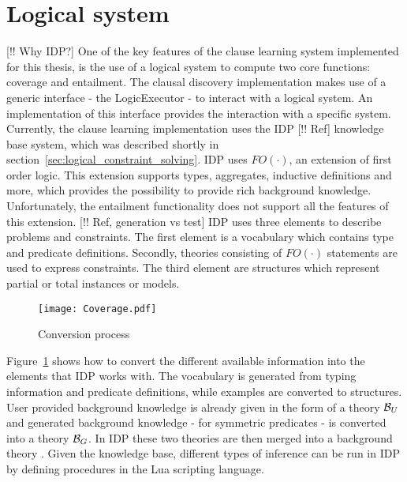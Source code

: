 \section{Logical system} [!! Why IDP?]
\label{sec:logical_system}
One of the key features of the clause learning system implemented for this thesis, is the use of a logical system to compute two core functions: coverage and entailment.
The clausal discovery implementation makes use of a generic  interface - the LogicExecutor - to interact with a logical system.
An implementation of this interface provides the interaction with a specific system.
Currently, the clause learning implementation uses the IDP [!! Ref] knowledge base system, which was described shortly in section~\ref{sec:logical_constraint_solving}.
IDP uses $FO(\cdotp)$, an extension of first order logic.
This extension supports types, aggregates, inductive definitions and more, which provides the possibility to provide rich background knowledge.
Unfortunately, the entailment functionality does not support all the features of this extension.
[!! Ref, generation vs test] IDP uses three elements to describe problems and constraints.
The first element is a vocabulary which contains type and predicate definitions.
Secondly, theories consisting of $FO(\cdotp)$ statements are used to express constraints.
The third element are structures which represent partial or total instances or models.

\begin{figure}

	\caption{Conversion process}
	\centering
		\texttt{[image: Coverage.pdf]}
	\label{fig:conversion_to_logic}

\end{figure}

Figure~\ref{fig:conversion_to_logic} shows how to convert the different available information into the elements that IDP works with.
The vocabulary is generated from typing information and predicate definitions, while examples are converted to structures.
User provided background knowledge is already given in the form of a theory $\mathcal{B}_U$ and generated background knowledge - for symmetric predicates - is converted into a theory $\mathcal{B}_G$.
In IDP these two theories are then merged into a background theory .
Given the knowledge base, different types of inference can be run in IDP by defining procedures in the Lua scripting language.

